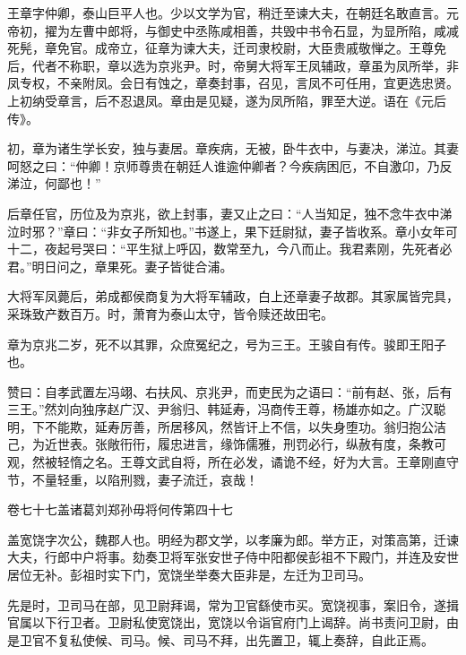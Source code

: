 \documentclass[12pt,UTF8]{ctexbook}
\begin{document}
王章字仲卿，泰山巨平人也。少以文学为官，稍迁至谏大夫，在朝廷名敢直言。元帝初，擢为左曹中郎将，与御史中丞陈咸相善，共毁中书令石显，为显所陷，咸减死髡，章免官。成帝立，征章为谏大夫，迁司隶校尉，大臣贵戚敬惮之。王尊免后，代者不称职，章以选为京兆尹。时，帝舅大将军王凤辅政，章虽为凤所举，非凤专权，不亲附凤。会日有蚀之，章奏封事，召见，言凤不可任用，宜更选忠贤。上初纳受章言，后不忍退凤。章由是见疑，遂为凤所陷，罪至大逆。语在《元后传》。



初，章为诸生学长安，独与妻居。章疾病，无被，卧牛衣中，与妻决，涕泣。其妻呵怒之曰：“仲卿！京师尊贵在朝廷人谁逾仲卿者？今疾病困厄，不自激卬，乃反涕泣，何鄙也！”



后章任官，历位及为京兆，欲上封事，妻又止之曰：“人当知足，独不念牛衣中涕泣时邪？”章曰：“非女子所知也。”书遂上，果下廷尉狱，妻子皆收系。章小女年可十二，夜起号哭曰：“平生狱上呼囚，数常至九，今八而止。我君素刚，先死者必君。”明日问之，章果死。妻子皆徙合浦。



大将军凤薨后，弟成都侯商复为大将军辅政，白上还章妻子故郡。其家属皆完具，采珠致产数百万。时，萧育为泰山太守，皆令赎还故田宅。



章为京兆二岁，死不以其罪，众庶冤纪之，号为三王。王骏自有传。骏即王阳子也。



赞曰：自孝武置左冯翊、右扶风、京兆尹，而吏民为之语曰：“前有赵、张，后有三王。”然刘向独序赵广汉、尹翁归、韩延寿，冯商传王尊，杨雄亦如之。广汉聪明，下不能欺，延寿厉善，所居移风，然皆讦上不信，以失身堕功。翁归抱公洁己，为近世表。张敞衎衎，履忠进言，缘饰儒雅，刑罚必行，纵赦有度，条教可观，然被轻惰之名。王尊文武自将，所在必发，谲诡不经，好为大言。王章刚直守节，不量轻重，以陷刑戮，妻子流迁，哀哉！





卷七十七盖诸葛刘郑孙毋将何传第四十七



盖宽饶字次公，魏郡人也。明经为郡文学，以孝廉为郎。举方正，对策高第，迁谏大夫，行郎中户将事。劾奏卫将军张安世子侍中阳都侯彭祖不下殿门，并连及安世居位无补。彭祖时实下门，宽饶坐举奏大臣非是，左迁为卫司马。



先是时，卫司马在部，见卫尉拜谒，常为卫官繇使市买。宽饶视事，案旧令，遂揖官属以下行卫者。卫尉私使宽饶出，宽饶以令诣官府门上谒辞。尚书责问卫尉，由是卫官不复私使候、司马。候、司马不拜，出先置卫，辄上奏辞，自此正焉。
\end{document}
